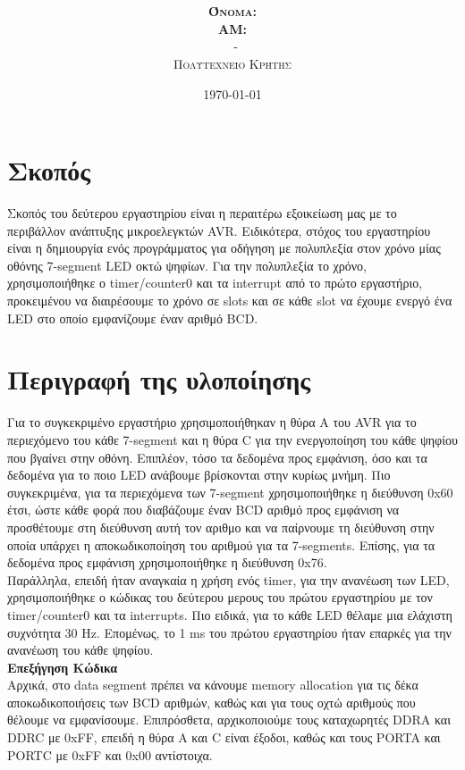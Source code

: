\documentclass{article}
\title{\underline{\textbf{\assignmentNumber}}}
\author{\textsc{\textbf{Όνομα:}}  \studentName\\
		\textsc{\textbf{ΑΜ:}}  \studentNumber\\
		\course \ - \courseName\\ 
		\textsc{Πολυτεχνείο Κρήτης}
		}
\date{\today}
\begin{document}
	\maketitle

\section*{Σκοπός}
	Σκοπός του δεύτερου εργαστηρίου είναι η περαιτέρω εξοικείωση μας με το περιβάλλον ανάπτυξης μικροελεγκτών AVR. Ειδικότερα, στόχος του εργαστηρίου είναι η δημιουργία ενός προγράμματος για οδήγηση με πολυπλεξία στον χρόνο μίας οθόνης 7-segment LED οκτώ ψηφίων. Για την πολυπλεξία το χρόνο, χρησιμοποιήθηκε ο timer/counter0 και τα interrupt από το πρώτο εργαστήριο, προκειμένου να διαιρέσουμε το χρόνο σε slots και σε κάθε slot να έχουμε ενεργό ένα LED στο οποίο εμφανίζουμε έναν αριθμό BCD.

\section*{Περιγραφή της υλοποίησης}
	Για το συγκεκριμένο εργαστήριο χρησιμοποιήθηκαν η θύρα Α του AVR για το περιεχόμενο του κάθε 7-segment και η θύρα C για την ενεργοποίηση του κάθε ψηφίου που βγαίνει στην οθόνη. Επιπλέον, τόσο τα δεδομένα προς εμφάνιση, όσο και τα δεδομένα για το ποιο LED ανάβουμε βρίσκονται στην κυρίως μνήμη. Πιο συγκεκριμένα, για τα περιεχόμενα των 7-segment χρησιμοποιήθηκε η διεύθυνση 0x60 έτσι, ώστε κάθε φορά που διαβάζουμε έναν BCD αριθμό προς εμφάνιση να προσθέτουμε στη διεύθυνση αυτή τον αριθμο και να παίρνουμε τη διεύθυνση στην οποία υπάρχει η αποκωδικοποίηση του αριθμού για τα 7-segments. Επίσης, για τα δεδομένα προς εμφάνιση χρησιμοποιήθηκε η διεύθυνση 0x76.\\
	
	\noindent
	Παράλληλα, επειδή ήταν αναγκαία η χρήση ενός timer, για την ανανέωση των LED, χρησιμοποιήθηκε ο κώδικας του δεύτερου μερους του πρώτου εργαστηρίου με τον timer/counter0 και τα interrupts. Πιο ειδικά, για το κάθε LED θέλαμε μια ελάχιστη συχνότητα 30 Hz. Eπομένως, το 1 ms του πρώτου εργαστηρίου ήταν επαρκές για την ανανέωση του κάθε ψηφίου. \\

	\noindent
	\textbf{Επεξήγηση Κώδικα} \\
	\noindent
	Aρχικά, στο data segment πρέπει να κάνουμε memory allocation για τις δέκα αποκωδικοποιήσεις των BCD αριθμών, καθώς και για τους οχτώ αριθμούς που θέλουμε να εμφανίσουμε. Επιπρόσθετα, αρχικοποιούμε τους καταχωρητές DDRA και DDRC με 0xFF, επειδή η θύρα A και C είναι έξοδοι, καθώς και τους PORTA και PORTC με 0xFF και 0x00 αντίστοιχα.\\
	
\end{document}
